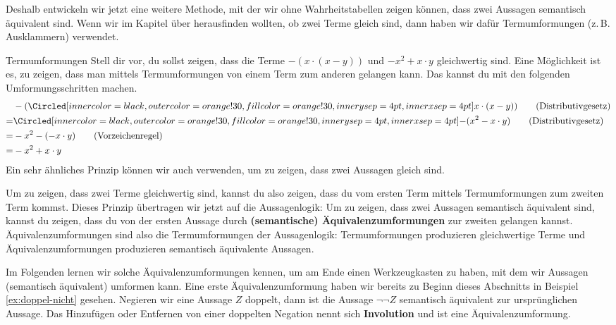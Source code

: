 \documentclass[../../main.tex]{subfiles}
\begin{document}
    Deshalb entwickeln wir jetzt eine weitere Methode, mit der wir ohne Wahrheitstabellen zeigen können, dass zwei Aussagen semantisch äquivalent sind.
    Wenn wir im Kapitel über  herausfinden wollten, ob zwei Terme gleich sind, dann haben wir dafür Termumformungen (z.\,B. Ausklammern) verwendet.
    
    \begin{example}{Termumformungen}
        Stell dir vor, du sollst zeigen, dass die Terme $-(x \cdot (x - y))$ und $-x^2 + x\cdot y$ 
        gleichwertig sind. Eine Möglichkeit ist es, zu zeigen, dass man mittels Termumformungen von 
        einem Term zum anderen gelangen kann. Das kannst du mit den folgenden Umformungsschritten machen.
        \begin{align*}
            &-(\circlemath{x\cdot (x-y)})\tag{Distributivgesetz}\\
            =&\circlemath{-(x^2-x\cdot y)}\tag{Distributivgesetz}\\
            =&-x^2-(-x\cdot y)\tag{Vorzeichenregel}\\
            =&-x^2+x\cdot y
        \end{align*}
        Ein sehr ähnliches Prinzip können wir auch verwenden, um zu zeigen, dass zwei Aussagen gleich sind.
    \end{example}
    
    Um zu zeigen, dass zwei Terme gleichwertig sind, kannst du also zeigen, dass du vom ersten Term mittels
    Termumformungen zum zweiten Term kommst. Dieses Prinzip übertragen wir jetzt auf die 
    Aussagenlogik: Um zu zeigen, dass zwei Aussagen semantisch äquivalent sind, kannst du zeigen, 
    dass du von der ersten Aussage durch \textbf{(semantische) Äquivalenzumformungen} zur zweiten gelangen kannst. 
    Äquivalenzumformungen sind also die Termumformungen der Aussagenlogik:
    Termumformungen produzieren gleichwertige Terme und Äquivalenzumformungen produzieren semantisch 
    äquivalente Aussagen.
    
    Im Folgenden lernen wir solche Äquivalenzumformungen kennen, um am Ende einen Werkzeugkasten zu haben, mit dem wir Aussagen (semantisch äquivalent) umformen kann.
    Eine erste Äquivalenzumformung haben wir bereits zu Beginn dieses Abschnitts in Beispiel \ref{ex:doppel-nicht} gesehen. 
    Negieren wir eine Aussage $Z$ doppelt, dann ist die Aussage $\lnot \lnot Z$ semantisch äquivalent zur ursprünglichen Aussage. Das Hinzufügen oder
    Entfernen von einer doppelten Negation nennt sich \textbf{Involution} und ist eine Äquivalenzumformung.
\end{document}
